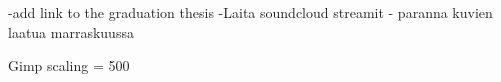 -add link to the graduation thesis
-Laita soundcloud streamit
- paranna kuvien laatua marraskuussa

Gimp scaling = 500 
